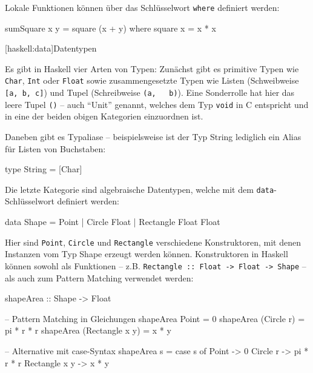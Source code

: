 \documentclass[11pt, a4paper, bibgerm]{scrbook}
\newenvironment{DIFnomarkup}{}{}
\newcommand\icode[1]{\lstinline?#1?}
\newcommand\lsection{}
\begin{document}
Lokale Funktionen können über das Schlüsselwort \icode{where} definiert
werden:
\begin{DIFnomarkup}\begin{code}
sumSquare x y = square (x + y)
  where
    square x = x * x
\end{code}\end{DIFnomarkup}

\lsection[haskell:data]{Datentypen}

Es gibt in Haskell vier Arten von Typen: Zunächst gibt es primitive
Typen wie \icode{Char}, \icode{Int} oder \icode{Float} sowie
zusammengesetzte Typen wie Listen (Schweibweise \icode{[a, b, c]}) und Tupel (Schreibweise \icode{(a,
  b)}). Eine Sonderrolle hat hier das leere Tupel \icode{()} -- auch
"`Unit"' genannt, welches dem Typ \icode{void} in C entspricht und in
eine der beiden obigen Kategorien einzuordnen ist.

Daneben gibt es Typaliase -- beispielsweise ist der Typ String lediglich
ein Alias für Listen von Buchstaben:
\begin{DIFnomarkup}\begin{code}
type String = [Char]
\end{code}\end{DIFnomarkup}

Die letzte Kategorie sind algebraische Datentypen, welche mit dem
\icode{data}-Schlüsselwort definiert werden:
\begin{DIFnomarkup}\begin{code}
data Shape = Point
           | Circle Float
           | Rectangle Float Float
\end{code}\end{DIFnomarkup}
Hier sind \icode{Point}, \icode{Circle} und \icode{Rectangle}
verschiedene Konstruktoren, mit denen Instanzen vom Typ Shape erzeugt
werden können. Konstruktoren in Haskell können sowohl als Funktionen --
z.B. \icode{Rectangle :: Float -> Float -> Shape} -- als auch zum Pattern
Matching verwendet werden:
\begin{DIFnomarkup}\begin{code}
shapeArea :: Shape -> Float

-- Pattern Matching in Gleichungen
shapeArea Point           = 0
shapeArea (Circle r)      = pi * r * r
shapeArea (Rectangle x y) = x * y

-- Alternative mit case-Syntax
shapeArea s = case s of
                Point         -> 0
                Circle r      -> pi * r * r
                Rectangle x y -> x * y
\end{code}\end{DIFnomarkup}
\end{document}
